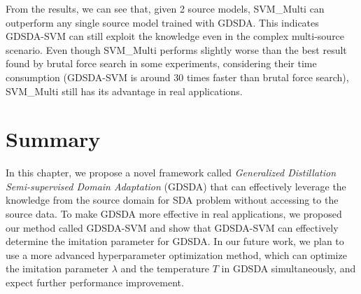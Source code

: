 From the results, we can see that, given 2 source models, SVM\_Multi can outperform any single source model trained with GDSDA. This indicates GDSDA-SVM can still exploit the knowledge even in the complex multi-source scenario. Even though SVM\_Multi performs slightly worse than the best result found by brutal force search in some experiments, considering their time consumption (GDSDA-SVM is around 30 times faster than brutal force search), SVM\_Multi still has its advantage in real applications.

\section{Summary}\label{sec:aaai:con}
In this chapter, we propose a novel framework called \textit{Generalized Distillation Semi-supervised Domain Adaptation} (GDSDA) that can effectively leverage the knowledge from the source domain for SDA problem without accessing to the source data. 
To make GDSDA more effective in real applications, we proposed our method called GDSDA-SVM and show that GDSDA-SVM can effectively determine the imitation parameter for GDSDA. 
In our future work, we plan to use a more advanced hyperparameter optimization method, which can optimize the imitation parameter $\lambda$ and the temperature $T$ in GDSDA simultaneously, and expect
further performance improvement. 